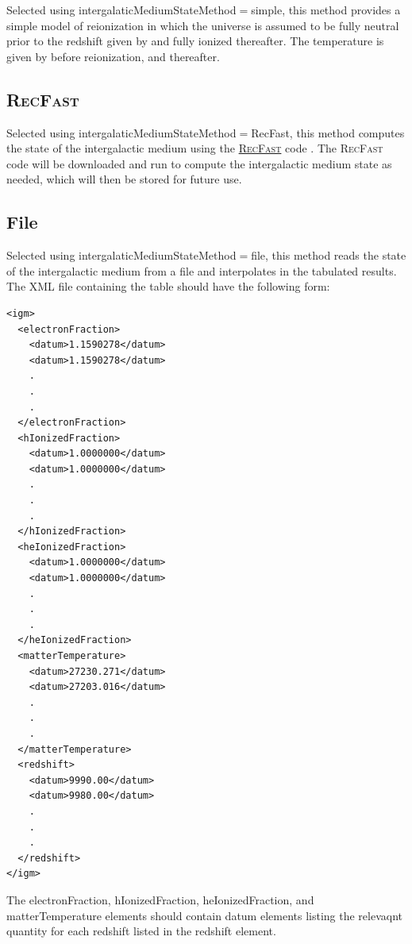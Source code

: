 Selected using {\normalfont \ttfamily intergalaticMediumStateMethod}$=${\normalfont \ttfamily simple}, this method provides a simple model of reionization in which the universe is assumed to be fully neutral prior to the redshift given by {\normalfont \ttfamily [igmStateSimpleReionizationRedshift]} and fully ionized thereafter. The temperature is given by {\normalfont \ttfamily [igmStateSimplePreReionizationTemperature]} before reionization, and {\normalfont \ttfamily [igmStateSimpleReionizationTemperature]} thereafter.

\subsection{{\normalfont \scshape RecFast}}\label{phys:intergalacticMediumState:intergalacticMediumStateRecFast}

Selected using {\normalfont \ttfamily intergalaticMediumStateMethod}$=${\normalfont \ttfamily RecFast}, this method computes the state of the intergalactic medium using the \href{http://www.astro.ubc.ca/people/scott/recfast.html}{{\normalfont \scshape RecFast}} code \cite{seager_how_2000,wong_how_2008}. The {\normalfont \scshape RecFast} code will be downloaded and run to compute the intergalactic medium state as needed, which will then be stored for future use.

\subsection{File}\label{phys:intergalacticMediumState:intergalacticMediumStateFile}

Selected using {\normalfont \ttfamily intergalaticMediumStateMethod}$=${\normalfont \ttfamily file}, this method reads the state of the intergalactic medium from a file and interpolates in the tabulated results. The XML file containing the table should have the following form:
 \begin{verbatim}
<igm>
  <electronFraction>
    <datum>1.1590278</datum>
    <datum>1.1590278</datum>
    .
    .
    .
  </electronFraction>
  <hIonizedFraction>
    <datum>1.0000000</datum>
    <datum>1.0000000</datum>
    .
    .
    .
  </hIonizedFraction>
  <heIonizedFraction>
    <datum>1.0000000</datum>
    <datum>1.0000000</datum>
    .
    .
    .
  </heIonizedFraction>
  <matterTemperature>
    <datum>27230.271</datum>
    <datum>27203.016</datum>
    .
    .
    .
  </matterTemperature>
  <redshift>
    <datum>9990.00</datum>
    <datum>9980.00</datum>
    .
    .
    .
  </redshift>
</igm>
 \end{verbatim}
 The {\normalfont \ttfamily electronFraction}, {\normalfont \ttfamily hIonizedFraction}, {\normalfont \ttfamily heIonizedFraction}, and {\normalfont \ttfamily matterTemperature} elements should contain {\normalfont \ttfamily datum} elements listing the relevaqnt quantity for each redshift listed in the {\normalfont \ttfamily redshift} element.


